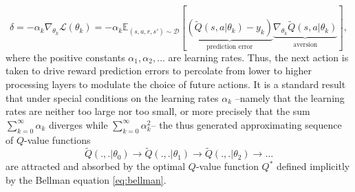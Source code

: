 \documentclass[10pt,letterpaper]{article}
\begin{document}

\begin{equation}
  \delta= -\alpha_k \nabla_{\theta_{k}}\mathcal L(\theta_{k})
  = -\alpha_k\mathbb E_{(s, a, r, s') \sim \mathcal D}[\underbrace{(\tilde{Q}(s, a|\theta_{k}) - y_k)}_{\text{prediction error}}
    \underbrace{\nabla_{\theta_{k}}\tilde{Q}(s, a|\theta_{k})}_{\text{aversion}}],
  \label{eq:oracle}
\end{equation}
where the positive constants $\alpha_1, \alpha_2,\ldots$ are learning rates.
Thus, the next action is taken to drive reward prediction errors
to percolate from lower to higher processing layers to modulate the
choice of future actions. It is a standard result that under special conditions on the learning rates $\alpha_k$ --namely that the learning rates are neither too large nor too small, or more precisely that the sum $\sum_{k=0}^\infty\alpha_k$ diverges while $\sum_{k=0}^\infty\alpha_k^2$--
the thus generated approximating sequence of $Q$-value functions
$$\tilde{Q}(.,.|\theta_0) \rightarrow \tilde{Q}(.,.|\theta_1) \rightarrow \tilde{Q}(.,.|\theta_2) \rightarrow \ldots$$
are attracted and absorbed by the optimal $Q$-value function $Q^*$ defined implicitly by the Bellman equation \eqref{eq:bellman}.

\end{document}
